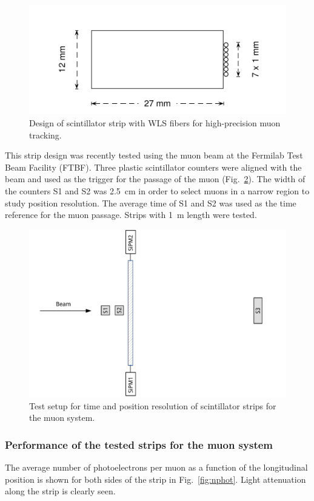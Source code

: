 \begin{figure}
  \centering
  \includegraphics[width=.6\textwidth]{bicron}
  \caption{\label{fig:design} Design of scintillator strip with WLS fibers
  for high-precision muon tracking.}
\end{figure}

This strip design was recently tested using the muon beam at the Fermilab Test Beam Facility (FTBF). Three plastic scintillator counters were aligned with the beam and used as the trigger for the passage of the muon (Fig.\ \ref{fig:setup}). The width of the counters \textsf{S1} and \textsf{S2} was 2.5~cm in order to select muons in a narrow region to study position resolution. The average time of \textsf{S1} and \textsf{S2} was used as the time reference for the muon passage. Strips with 1~m length were tested.

\begin{figure}[h!]
  \centering
  \includegraphics[width=.9\textwidth]{setup}
  \caption{\label{fig:setup} Test setup for time and position resolution of scintillator strips for the muon system.}
\end{figure}


\subsubsection{Performance of the tested strips for the muon system}

The average number of photoelectrons per muon as a function of the longitudinal position is shown for both sides of the strip in Fig.\ \ref{fig:nphot}. Light attenuation along the strip is clearly seen.

